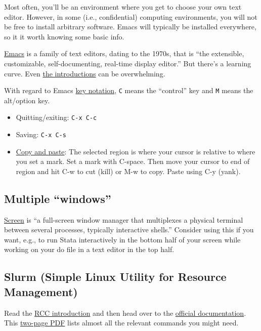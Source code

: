 Most often, you'll be an environment where you get to choose your own text editor.
However, in some (i.e., confidential) computing environments, you will not be free to install arbitrary software.
Emacs will typically be installed everywhere, so it it worth knowing some basic info.

\href{https://en.wikipedia.org/wiki/Emacs}{Emacs} is a family of text editors, dating to the 1970s, that is ``the extensible, customizable, self-documenting, real-time display editor.''
But there's a learning curve.
Even \href{https://www.gnu.org/software/emacs/tour/}{the introductions} can be overwhelming.

With regard to Emacs \href{https://www.emacswiki.org/emacs/EmacsKeyNotation}{key notation},
\texttt{C} means the ``control'' key and \texttt{M} means the alt/option key.

\begin{itemize}
	\item Quitting/exiting: \texttt{C-x C-c}
	\item Saving: \texttt{C-x C-s}
	\item \href{https://www.emacswiki.org/emacs/CopyAndPaste}{Copy and paste}: 
	The selected region is where your cursor is relative to where you set a mark.
	Set a mark with C-space.
	Then move your cursor to end of region and hit C-w to cut (kill) or M-w to copy.
	Paste using C-y (yank).

\end{itemize}

\subsection{Multiple ``windows''}

\href{https://www.gnu.org/software/screen/manual/}{Screen} is ``a full-screen window manager that multiplexes a physical terminal between several processes, typically interactive shells.''
Consider using this if you want, e.g., to run Stata interactively in the bottom half of your screen while working on your do file in a text editor in the top half.

\subsection{Slurm (Simple Linux Utility for Resource Management)}

Read the \href{https://rcc.uchicago.edu/docs/using-midway/index.html#batch-jobs}{RCC introduction} and then head over to the \href{https://slurm.schedmd.com/overview.html}{official documentation}.
This \href{https://slurm.schedmd.com/pdfs/summary.pdf}{two-page PDF} lists almost all the relevant commands you might need.

